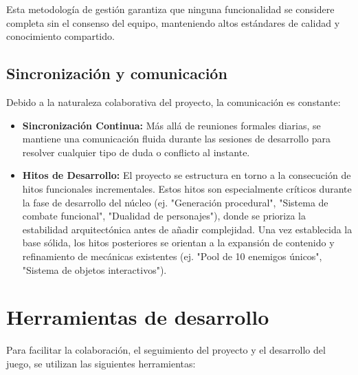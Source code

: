 Esta metodología de gestión garantiza que ninguna funcionalidad se considere completa 
sin el consenso del equipo, manteniendo altos estándares de calidad y conocimiento compartido.

\subsection{Sincronización y comunicación}

Debido a la naturaleza colaborativa del proyecto, la comunicación es constante:
\begin{itemize}
    \item \textbf{Sincronización Continua:} Más allá de reuniones formales diarias, 
    se mantiene una comunicación fluida durante las sesiones de desarrollo para resolver 
    cualquier tipo de duda o conflicto al instante.
    \item \textbf{Hitos de Desarrollo:} El proyecto se estructura en torno a la consecución 
    de hitos funcionales incrementales. Estos hitos son especialmente críticos durante 
    la fase de desarrollo del núcleo (ej. "Generación procedural", "Sistema de combate 
    funcional", "Dualidad de personajes"), donde se prioriza la estabilidad 
    arquitectónica antes de añadir complejidad. Una vez establecida la base sólida, 
    los hitos posteriores se orientan a la expansión de contenido y refinamiento de 
    mecánicas existentes (ej. "Pool de 10 enemigos únicos", "Sistema de objetos interactivos").
\end{itemize}

\section{Herramientas de desarrollo}

Para facilitar la colaboración, el seguimiento del proyecto y el desarrollo del juego, 
se utilizan las siguientes herramientas:

